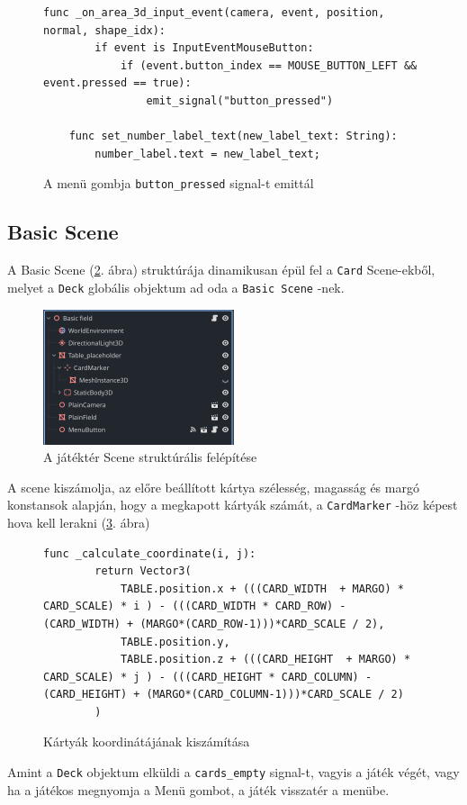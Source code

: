 \begin{figure}[H]
    \centering
    \begin{lstlisting}[language=GDScript]
    func _on_area_3d_input_event(camera, event, position, normal, shape_idx):
        if event is InputEventMouseButton:
            if (event.button_index == MOUSE_BUTTON_LEFT && event.pressed == true):
                emit_signal("button_pressed")
    
    func set_number_label_text(new_label_text: String):
        number_label.text = new_label_text;
    \end{lstlisting}
    \caption{A menü gombja  \lstinline{button_pressed} signal-t emittál}
    \label{code:button_pressed_signal}
\end{figure}

\subsection{Basic Scene}

A Basic Scene (\ref{img:basic_scene}. ábra) struktúrája dinamikusan épül fel a \lstinline{Card} Scene-ekből, melyet a \lstinline|Deck| globális objektum ad oda a \lstinline|Basic Scene| -nek. 
\begin{figure}[H]
    \centering
    \includegraphics[width=0.5\textwidth]{img/basic_field_scene_structure.png}
    \caption{A játéktér Scene struktúrális felépítése}
    \label{img:basic_scene}  
\end{figure}
A scene kiszámolja, az előre beállított kártya szélesség, magasság és margó konstansok alapján, hogy a megkapott kártyák számát, a \lstinline|CardMarker| -höz képest hova kell lerakni (\ref{code:calculate_coordinate}. ábra)
\begin{figure}[H]
    \centering
    \begin{lstlisting}[language=GDScript]
        func _calculate_coordinate(i, j):
        return Vector3(
            TABLE.position.x + (((CARD_WIDTH  + MARGO) * CARD_SCALE) * i ) - (((CARD_WIDTH * CARD_ROW) - (CARD_WIDTH) + (MARGO*(CARD_ROW-1)))*CARD_SCALE / 2),
            TABLE.position.y,
            TABLE.position.z + (((CARD_HEIGHT  + MARGO) * CARD_SCALE) * j ) - (((CARD_HEIGHT * CARD_COLUMN) - (CARD_HEIGHT) + (MARGO*(CARD_COLUMN-1)))*CARD_SCALE / 2)
        )
    \end{lstlisting}
    \caption{Kártyák koordinátájának kiszámítása}
    \label{code:calculate_coordinate}
\end{figure}
Amint a \lstinline|Deck| objektum elküldi a \lstinline{cards_empty} signal-t, vagyis a játék végét, vagy ha a játékos megnyomja a Menü gombot, a játék visszatér a menübe. 


